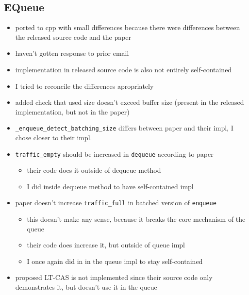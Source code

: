 \subsection{EQueue}
\begin{itemize}
    \item ported to cpp with small differences because there were differences between the released source
        code and the paper
    \item haven't gotten response to prior email
    \item implementation in released source code is also not entirely self-contained
    \item I tried to reconcile the differences apropriately
    \item added check that used size doesn't exceed buffer size (present in the released implementation, but
        not in the paper)
    \item \texttt{\_enqueue\_detect\_batching\_size} differs between paper and their impl, I chose closer to their impl.
    \item \texttt{traffic\_empty} should be increased in \texttt{dequeue} according to paper
        \begin{itemize}
            \item their code does it outside of dequeue method
            \item I did inside dequeue method to have self-contained impl
        \end{itemize}
    \item paper doesn't increase \texttt{traffic\_full} in batched version of \texttt{enqueue}
        \begin{itemize}
            \item this doesn't make any sense, because it breaks the core mechanism of the queue
            \item their code does increase it, but outside of queue impl
            \item I once again did in in the queue impl to stay self-contained
        \end{itemize}
    \item proposed LT-CAS is not implemented since their source code only demonstrates it, but doesn't use it
        in the queue
\end{itemize}

